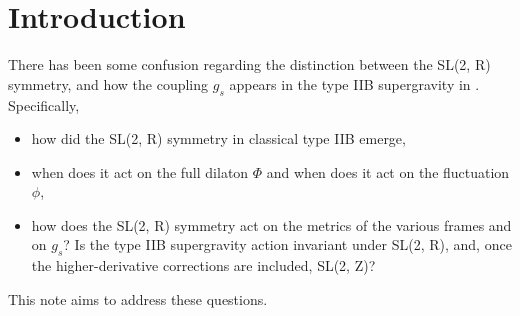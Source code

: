 \section{Introduction}

There has been some confusion regarding the distinction between the SL(2, R) symmetry, and how the coupling $g_s$ appears in the type IIB supergravity in \cite{Cheng:2025efp}.
Specifically, 
\begin{itemize}
    \item how did the SL(2, R) symmetry in classical type IIB emerge,
    \item when does it act on the full dilaton $\Phi$ and when does it act on the fluctuation $\phi$,
    \item how does the SL(2, R) symmetry act on the metrics of the various frames and on $g_s$? Is the type IIB supergravity action invariant under SL(2, R), and, once the higher-derivative corrections are included, SL(2, Z)?
\end{itemize}
This note aims to address these questions.







